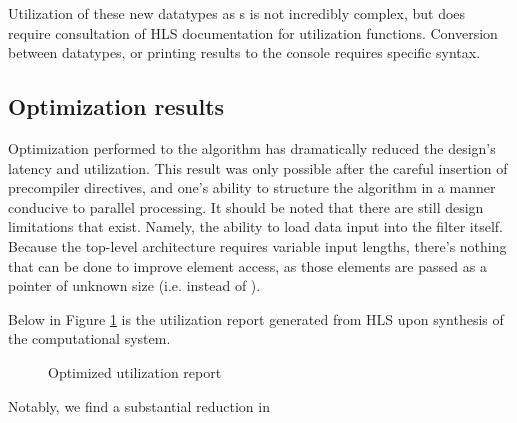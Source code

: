 \documentclass[11pt]{report}
\begin{document}
Utilization of these new datatypes as s is not incredibly complex, but does require consultation of HLS documentation for utilization functions. Conversion between datatypes, or printing results to the console requires specific syntax.

\subsection{Optimization results}

Optimization performed to the algorithm has dramatically reduced the design's latency and utilization. This result was only possible after the careful insertion of precompiler directives, and one's ability to structure the algorithm in a manner conducive to parallel processing. It should be noted that there are still design limitations that exist. Namely, the ability to load data input into the filter itself. Because the top-level architecture requires variable input lengths, there's nothing that can be done to improve element access, as those elements are passed as a pointer of unknown size (i.e.  instead of ).

Below in Figure \ref{optimizedFIRutil} is the utilization report generated from HLS upon synthesis of the computational system. 

 \begin{figure}[h!]
 	\begin{center}
 		\fboxsep=0mm
 		\caption{Optimized utilization report}
 		\label{optimizedFIRutil}
 	\end{center}
 \end{figure}
 \FloatBarrier
 
 Notably, we find a substantial reduction in 
 
 
\end{document}
